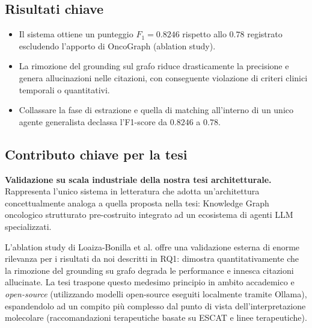 \documentclass[12pt, a4paper]{article}
\begin{document}
\subsection{Risultati chiave}
\begin{itemize}[leftmargin=1.8em, itemsep=2pt]
  \item Il sistema ottiene un punteggio $F_1 = 0.8246$ rispetto allo $0.78$ registrato escludendo l'apporto di OncoGraph (ablation study).
  \item La rimozione del grounding sul grafo riduce drasticamente la precisione e genera allucinazioni nelle citazioni, con conseguente violazione di criteri clinici temporali o quantitativi.
  \item Collassare la fase di estrazione e quella di matching all'interno di un unico agente generalista declassa l'F1-score da $0.8246$ a $0.78$.
\end{itemize}

\subsection{Contributo chiave per la tesi}
\textbf{Validazione su scala industriale della nostra tesi architetturale.}\\
Rappresenta l'unico sistema in letteratura che adotta un'architettura concettualmente analoga a quella proposta nella tesi: Knowledge Graph oncologico strutturato pre-costruito integrato ad un ecosistema di agenti LLM specializzati.

L'ablation study di Loaiza-Bonilla et al. offre una validazione esterna di enorme rilevanza per i risultati da noi descritti in RQ1: dimostra quantitativamente che la rimozione del grounding su grafo degrada le performance e innesca citazioni allucinate. La tesi traspone questo medesimo principio in ambito accademico e \textit{open-source} (utilizzando modelli open-source eseguiti localmente tramite Ollama), espandendolo ad un compito più complesso dal punto di vista dell'interpretazione molecolare (raccomandazioni terapeutiche basate su ESCAT e linee terapeutiche).
\end{document}

